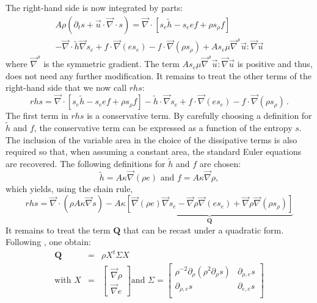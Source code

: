 \documentclass[review,10pt]{elsarticle}
\renewcommand{\div}{\vec{\nabla}\! \cdot \!}
\newcommand{\grad}{\vec{\nabla}}
\begin{document}
%
The right-hand side is now integrated by parts:
%
\begin{multline}
\label{eq:ent_res_app3}
A \rho \left( \partial_t s + \vec{u} \cdot \div s \right) = \div \left[ s_e \tilde{h}-s_e e f  + \rho s_{\rho} f \right]  \\
-\div \tilde{h} \grad s_e  + f \cdot \grad (e s_e) -  f \cdot \grad ( \rho s_{\rho} ) + A s_e \mu \grad^s \vec{u} : \grad \vec{u} 
\end{multline}
%
where $\grad^s$ is the symmetric gradient. The term $A s_e \mu \grad^s \vec{u} : \grad \vec{u}$ is positive and thus, 
does not need any further modification. It %
remains to treat the other terms of the right-hand side that we now call $rhs$:
%
\begin{equation}
rhs = \div \left[ s_e \tilde{h}-s_e e f  + \rho s_{\rho} f \right] - \tilde{h} \cdot \grad s_e  + f \cdot \grad (e s_e) - f \cdot \grad ( \rho s_{\rho} )  \,. \nonumber
\end{equation}
%
The first term in $rhs$ is a conservative term. By carefully choosing a definition for $\tilde{h}$ and $f$, the 
conservative term can be expressed as a function of the entropy $s$. The inclusion of the variable area in the 
choice of the dissipative terms is also required so that, when assuming a constant area, the standard Euler 
equations are recovered. The following definitions for $\tilde{h}$ and $f$ are chosen:
%
\begin{equation}
\tilde{h} = A \kappa \grad ( \rho e ) \text{  and  } f = A \kappa \grad \rho, \nonumber 
\end{equation}
%
which yields, using the chain rule,
%
\begin{equation}
rhs = \div (\rho A \kappa \grad s ) - A \kappa \underbrace{\left[ \grad (\rho e) \grad s_e  - \grad \rho \grad (e s_e) +  \grad \rho \grad ( \rho s_{\rho} )  \right]}_{\mathbf{Q}} \nonumber
\end{equation}
%
It remains to treat the term $\mathbf{Q}$ that can be recast under a quadratic form. Following \cite{jlg}, one obtain:
%
\begin{eqnarray}
\mathbf{Q} &=& \rho X^t \Sigma X \nonumber \\
\text{with } X &=& \begin{bmatrix}
\grad \rho \\
\grad e 
\end{bmatrix}
\text{and } \Sigma = \begin{bmatrix}
       \rho^{-2}\partial_{\rho} (\rho^2 \partial_{\rho} s) & \partial_{\rho,e} s  \\[0.3em]
       \partial_{\rho,e} s & \partial_{e,e} s           \\[0.3em]
     \end{bmatrix} \nonumber 
\end{eqnarray}
\end{document}

